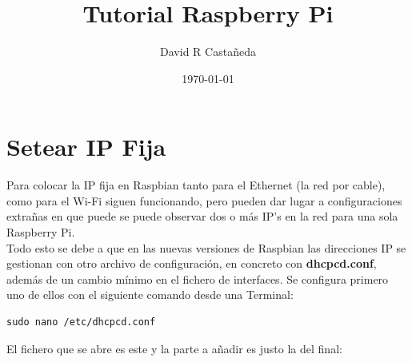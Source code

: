 \documentclass{article}
\begin{document}
\title{Tutorial Raspberry Pi}
\author{David R Castañeda}
\date{\today}

\maketitle
\section{Setear IP Fija}

Para colocar la IP fija en Raspbian tanto para el Ethernet (la red por cable), como para el Wi-Fi siguen funcionando, pero pueden dar lugar a configuraciones extrañas en que puede se puede observar dos o más IP's en la red para una sola Raspberry Pi.\\

Todo esto se debe a que en las nuevas versiones de Raspbian las direcciones IP se gestionan con otro archivo de configuración, en concreto con \textbf{dhcpcd.conf}, además de un cambio mínimo en el fichero de interfaces. Se configura primero uno de ellos con el siguiente comando desde una Terminal:\\

\begin{verbatim}
sudo nano /etc/dhcpcd.conf 
\end{verbatim}

El fichero que se abre es este y la parte a añadir es justo la del final:
\end{document}
